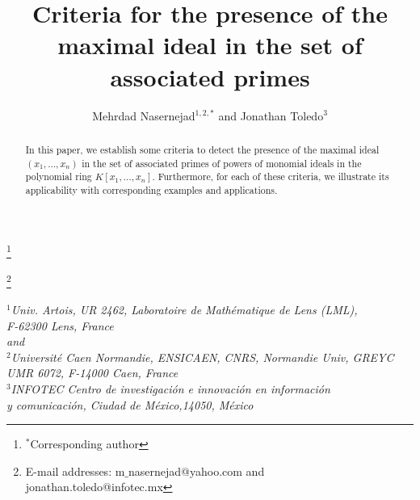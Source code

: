 \documentclass[11pt]{amsart}
\begin{document}
\author[M. Nasernejad   and   J. Toledo]{Mehrdad  Nasernejad$^{1,2,*}$ and   Jonathan Toledo$^{3}$}
\title[Criteria for  the presence of the maximal  ideal]{Criteria for the presence of the maximal  ideal in the set of  associated primes}


\thanks{$^*$Corresponding author}



\thanks{E-mail addresses:  m$\_$nasernejad@yahoo.com  and  jonathan.toledo@infotec.mx}  
\maketitle

\begin{center}
{\it
$^{1}$Univ. Artois, UR 2462, Laboratoire de Math\'{e}matique de  Lens (LML), \\  F-62300 Lens, France \\ and \\
$^{2}$Universit\'e  Caen Normandie, ENSICAEN, CNRS, Normandie Univ, GREYC UMR  6072, F-14000 Caen,  France\\
$^{3}$INFOTEC Centro de investigaci\'{o}n e innovaci\'{o}n en informaci\'{o}n \\
 y comunicaci\'{o}n, Ciudad de M\'{e}xico,14050, M\'{e}xico
}
\end{center}

\vspace{0.4cm}



\begin{abstract}
In this paper, we establish some criteria to detect the presence of the maximal ideal $(x_1, \ldots, x_n)$ in the set of associated primes of powers of monomial ideals in the polynomial ring $K[x_1, \ldots, x_n]$. Furthermore, for each of these criteria, we illustrate its applicability with corresponding examples and applications.
 \end{abstract}
\vspace{0.4cm}


\end{document}
